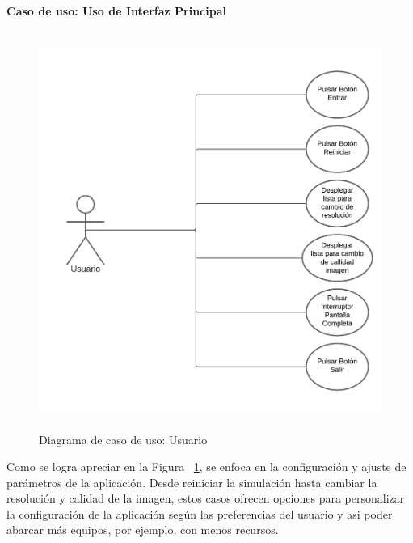 \textbf{Caso de uso: Uso de Interfaz Principal}
\begin{figure}[ht]
\centering
\includegraphics[width=13cm, height=13cm]{figures/cuui.png}
\caption{Diagrama de caso de uso: Usuario}
\label{fig:cuui}
\end{figure}

Como se logra apreciar en la Figura ~\ref{fig:cuui}, se enfoca en la configuración y ajuste de parámetros de la aplicación. Desde reiniciar la simulación hasta cambiar la resolución y calidad de la imagen, estos casos ofrecen opciones para personalizar la configuración de la aplicación según las preferencias del usuario y asi poder abarcar más equipos, por ejemplo, con menos recursos.


